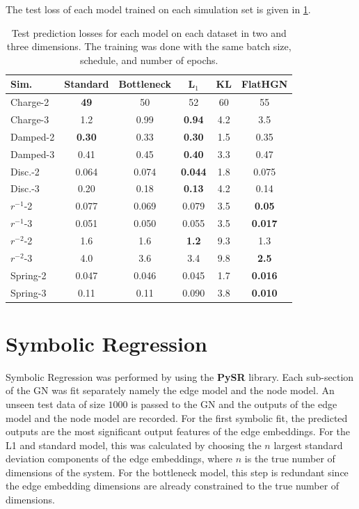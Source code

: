 \documentclass{article}
\begin{document}
The test loss of each model trained on each simulation set
is given in \cref{tbl:losses}.
\begin{table}[h]
\centering
\begin{tabular}{@{}lccccc@{}}
\toprule
Sim. & Standard & Bottleneck & L$_1$       &  KL      & FlatHGN \\ \midrule
Charge-2 & \textbf{49} & 50 & 52 & 60 & 55 \\
Charge-3 & 1.2 & 0.99 & \textbf{0.94} & 4.2 & 3.5 \\
Damped-2 & \textbf{0.30} & 0.33 & \textbf{0.30} & 1.5 & 0.35 \\
Damped-3 & 0.41 & 0.45 & \textbf{0.40} & 3.3 & 0.47 \\
Disc.-2 & 0.064 & 0.074 & \textbf{0.044} & 1.8 & 0.075 \\
Disc.-3 & 0.20 & 0.18 & \textbf{0.13} & 4.2 & 0.14 \\
$r^{-1}$-2 & 0.077 & 0.069 & 0.079 & 3.5 & \textbf{0.05} \\
$r^{-1}$-3 & 0.051 & 0.050 & 0.055 & 3.5 & \textbf{0.017} \\
$r^{-2}$-2 & 1.6 & 1.6 & \textbf{1.2} & 9.3 & 1.3 \\
$r^{-2}$-3 & 4.0 & 3.6 & 3.4 & 9.8 & \textbf{2.5} \\
Spring-2 & 0.047 & 0.046 & 0.045 & 1.7 & \textbf{0.016} \\
Spring-3 & 0.11 & 0.11 & 0.090 & 3.8 & \textbf{0.010} \\ \bottomrule
\end{tabular}
\caption{Test prediction losses for each model on each dataset in two and three
dimensions.
The training was done with the same batch size, schedule,
and number of epochs. }
\label{tbl:losses}
\end{table}

\section{Symbolic Regression}

Symbolic Regression was performed by using the \textbf{PySR} library. Each sub-section of the GN was fit separately namely the edge model and the node model. An unseen test data of size $1000$ is passed to the GN and the outputs of the edge model and the node model are recorded. For the first symbolic fit, the predicted outputs are the most significant output features of the edge embeddings. For the L1 and standard model, this was calculated by choosing the \( n \) largest standard deviation components of the edge embeddings, where \( n \) is the true number of dimensions of the system. For the bottleneck model, this step is redundant since the edge embedding dimensions are already constrained to the true number of dimensions.
\end{document}
